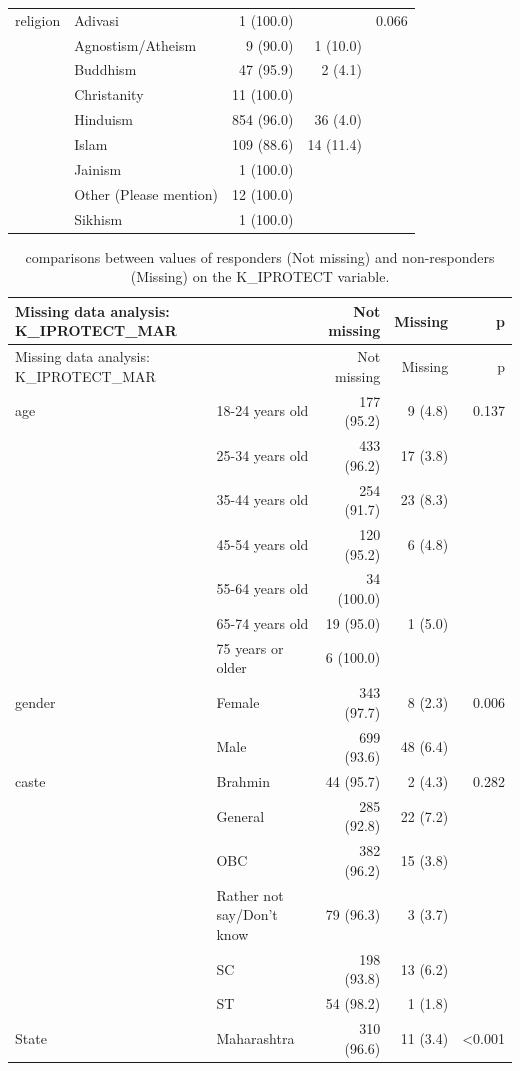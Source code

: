 \documentclass[
]{article}
\begin{document}
\begin{longtable}[]{@{}llrrr@{}}
religion & Adivasi & 1 (100.0) & & 0.066 \\
& Agnostism/Atheism & 9 (90.0) & 1 (10.0) & \\
& Buddhism & 47 (95.9) & 2 (4.1) & \\
& Christanity & 11 (100.0) & & \\
& Hinduism & 854 (96.0) & 36 (4.0) & \\
& Islam & 109 (88.6) & 14 (11.4) & \\
& Jainism & 1 (100.0) & & \\
& Other (Please mention) & 12 (100.0) & & \\
& Sikhism & 1 (100.0) & & \\
\bottomrule
\end{longtable}

\begin{longtable}[]{@{}llrrr@{}}
\caption{comparisons between values of responders (Not missing) and
non-responders (Missing) on the K\_IPROTECT variable.}\tabularnewline
\toprule
Missing data analysis: K\_IPROTECT\_MAR & & Not missing & Missing & p \\
\midrule
\endfirsthead
\toprule
Missing data analysis: K\_IPROTECT\_MAR & & Not missing & Missing & p \\
\midrule
\endhead
age & 18-24 years old & 177 (95.2) & 9 (4.8) & 0.137 \\
& 25-34 years old & 433 (96.2) & 17 (3.8) & \\
& 35-44 years old & 254 (91.7) & 23 (8.3) & \\
& 45-54 years old & 120 (95.2) & 6 (4.8) & \\
& 55-64 years old & 34 (100.0) & & \\
& 65-74 years old & 19 (95.0) & 1 (5.0) & \\
& 75 years or older & 6 (100.0) & & \\
gender & Female & 343 (97.7) & 8 (2.3) & 0.006 \\
& Male & 699 (93.6) & 48 (6.4) & \\
caste & Brahmin & 44 (95.7) & 2 (4.3) & 0.282 \\
& General & 285 (92.8) & 22 (7.2) & \\
& OBC & 382 (96.2) & 15 (3.8) & \\
& Rather not say/Don't know & 79 (96.3) & 3 (3.7) & \\
& SC & 198 (93.8) & 13 (6.2) & \\
& ST & 54 (98.2) & 1 (1.8) & \\
State & Maharashtra & 310 (96.6) & 11 (3.4) & \textless0.001 \\

\end{longtable}
\end{document}
